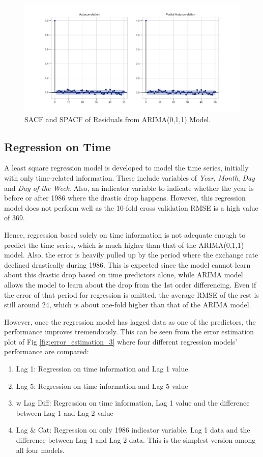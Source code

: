 \documentclass[]{article}
\begin{document}
\begin{figure}[ht]
	\centering
	\includegraphics[width=1\columnwidth]{../Figures/sacf_n_spacf_after_arma.pdf}
	\caption{SACF and SPACF of Residuals from ARIMA(0,1,1) Model.}
	\label{fig:sacf_n_spacf_after_arma}
\end{figure}
%

\subsection{Regression on Time}
A least square regression model is developed to model the time series, initially with only time-related information. These include variables of \textit{Year}, \textit{Month}, \textit{Day} and \textit{Day of the Week}. Also, an indicator variable to indicate whether the year is before or after 1986 where the drastic drop happens. However, this regression model does not perform well as the 10-fold cross validation RMSE is a high value of 369. 

Hence, regression based solely on time information is not adequate enough to predict the time series, which is much higher than that of the ARIMA(0,1,1) model. Also, the error is heavily pulled up by the period where the exchange rate declined drastically during 1986. This is expected since the model cannot learn about this drastic drop based on time predictors alone, while ARIMA model allows the model to learn about the drop from the 1st order differencing. Even if the error of that period for regression is omitted, the average RMSE of the rest is still around 24, which is about one-fold higher than that of the ARIMA model.

However, once the regression model has lagged data as one of the predictors, the performance improves tremendously. This can be seen from the error estimation plot of Fig \ref{fig:error_estimation_3} where four different regression models' performance are compared:
\begin{enumerate}
	\item Lag 1: Regression on time information and Lag 1 value
	\item Lag 5: Regression on time information and Lag 5 value
	\item w Lag Diff: Regression on time information, Lag 1 value and the difference between Lag 1 and Lag 2 value
	\item  Lag \& Cat: Regression on only 1986 indicator variable, Lag 1 data and the difference between Lag 1 and Lag 2 data. This is the simplest version among all four models.
\end{enumerate}
\end{document}
